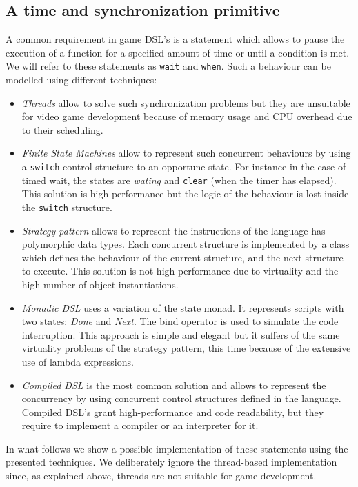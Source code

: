 \subsection{A time and synchronization primitive}
\label{subsec:synchronization}
A common requirement in game DSL's is a statement which allows to pause the execution of a function for a specified amount of time or until a condition is met. We will refer to these statements as \texttt{wait} and \texttt{when}. Such a behaviour can be modelled using different techniques:

\begin{itemize}
	\item \textit{Threads} allow to solve such synchronization problems but they are unsuitable for video game development because of memory usage and CPU overhead due to their scheduling.
	\item \textit{Finite State Machines} allow to represent such concurrent behaviours \cite{CASANOVA2_PAPER} by using a \texttt{switch} control structure to an opportune state. For instance in the case of timed wait, the states are \textit{wating} and \texttt{clear} (when the timer has elapsed). This solution is high-performance but the logic of the behaviour is lost inside the \texttt{switch} structure.
	\item \textit{Strategy pattern} allows to represent the instructions of the language has polymorphic data types. Each concurrent structure is implemented by a class which defines the behaviour of the current structure, and the next structure to execute. This solution is not high-performance due to virtuality and the high number of object instantiations.
	\item \textit{Monadic DSL} uses a variation of the state monad. It represents scripts with two states: \textit{Done} and \textit{Next}. The bind operator is used to simulate the code interruption. This approach is simple and elegant but it suffers of the same virtuality problems of the strategy pattern, this time because of the extensive use of lambda expressions.
	\item \textit{Compiled DSL} is the most common solution and allows to represent the concurrency by using concurrent control structures defined in the language. Compiled DSL's grant high-performance and code readability, but they require to implement a compiler or an interpreter for it.
\end{itemize}

In what follows we show a possible implementation of these statements using the presented techniques. We deliberately ignore the thread-based implementation since, as explained above, threads are not suitable for game development.

